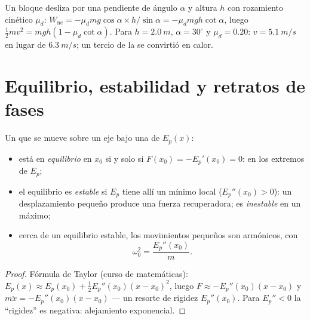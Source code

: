 \begin{example}\label{ex:b1:work-and-energy:friction}
Un bloque desliza por una pendiente de ángulo $\alpha$ y altura $h$ con
rozamiento cinético $\mu_d$: $W_{\text{nc}} = -\mu_dmg\cos\alpha \times
h/\sin\alpha = -\mu_dmgh\cot\alpha$, luego $\tfrac12 mv^2 = mgh(1 - \mu_d\cot\alpha)$.
Para $h = \qty{2.0}{m}$, $\alpha = 30^\circ$ y $\mu_d = 0.20$: $v =
\qty{5.1}{m/s}$ en lugar de $\qty{6.3}{m/s}$; un tercio de la  se convirtió en calor.
\end{example}

\section{Equilibrio, estabilidad y retratos de fases}

\begin{proposition}\label{prop:b1:work-and-energy:stability}
Un  que se mueve sobre un eje bajo una 
de  $E_p(x)$:
\begin{itemize}
  \item está en \emph{equilibrio} en $x_0$ si y solo si $F(x_0) = -E_p'(x_0) = 0$:
        en los extremos de $E_p$;
  \item el equilibrio es \emph{estable} si $E_p$ tiene allí un mínimo
        local ($E_p''(x_0) > 0$): un desplazamiento pequeño produce una
        fuerza recuperadora; es \emph{inestable} en un máximo;
  \item cerca de un equilibrio estable, los movimientos pequeños son
        armónicos, con
        \[
        \omega_0^2 = \frac{E_p''(x_0)}{m} .
        \]
\end{itemize}
\end{proposition}

\begin{proof}
Fórmula de Taylor (curso de matemáticas): $E_p(x) \approx E_p(x_0) +
\tfrac12 E_p''(x_0)(x - x_0)^2$, luego $F \approx -E_p''(x_0)(x - x_0)$ y
$m\ddot x = -E_p''(x_0)(x - x_0)$ --- un resorte de rigidez $E_p''(x_0)$.
Para $E_p'' < 0$ la ``rigidez'' es negativa: alejamiento exponencial.
\end{proof}

